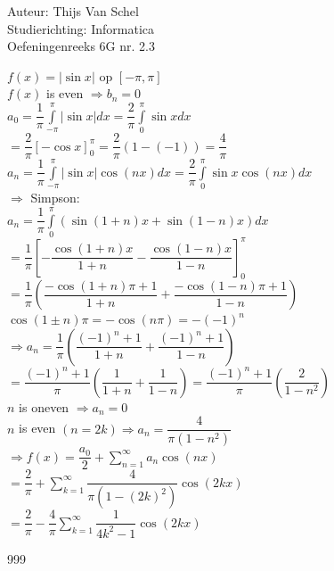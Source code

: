 \documentclass[a4paper]{article}
\newcommand{\dint}{\displaystyle\int}
\begin{document}
  
\noindent \large Auteur: Thijs Van Schel \\
\noindent \large Studierichting: Informatica\\
\noindent \large Oefeningenreeks 6G nr. 2.3\\

\medskip

\normalsize

$f(x) = |\sin x|$ op $[-\pi, \pi]$\\

$f(x)$ is even $ \Rightarrow b_n = 0$\\

$a_0 = \dfrac{1}{\pi} \dint\limits_{-\pi}^{\pi} |\sin x| dx = \dfrac{2}{\pi} \dint\limits_{0}^{\pi} \sin x dx$\\

$= \dfrac{2}{\pi} [-\cos x]_{0}^{\pi} = \dfrac{2}{\pi} (1 - (-1)) = \dfrac{4}{\pi}$ \\

$a_n = \dfrac{1}{\pi} \dint\limits_{-\pi}^{\pi} |\sin x| \cos(nx) dx = \dfrac{2}{\pi} \dint\limits_{0}^{\pi} \sin x \cos(nx)dx$\\

$\Rightarrow$ Simpson:\\

$a_n = \dfrac{1}{\pi} \dint\limits_{0}^{\pi} (\sin(1+n)x + \sin(1-n)x)dx$\\

$= \dfrac{1}{\pi} \left[ -\dfrac{\cos(1+n)x}{1+n} - \dfrac{\cos(1-n)x}{1-n} \right]_{0}^{\pi}$\\

$= \dfrac{1}{\pi}\left( \dfrac{- \cos(1+n)\pi + 1}{1+n} + \dfrac{- \cos(1-n)\pi + 1}{1-n}\right)$\\

$\cos(1 \pm n)\pi = -\cos(n\pi) = -(-1)^n$\\

$\Rightarrow a_n = \dfrac{1}{\pi} \left( \dfrac{(-1)^n + 1}{1+n} + \dfrac{(-1)^n + 1}{1-n} \right)$\\

$= \dfrac{(-1)^n + 1}{\pi} \left( \dfrac{1}{1+n} + \dfrac{1}{1-n} \right) = \dfrac{(-1)^n + 1}{\pi} \left( \dfrac{2}{1-n^2} \right)$\\

$n $ is oneven $ \Rightarrow a_n = 0$\\

$n $ is even $ (n=2k) \Rightarrow a_n = \dfrac{4}{\pi(1-n^2)}$\\

$\Rightarrow f(x) = \dfrac{a_0}{2} + \displaystyle\sum_{n=1}^{\infty} a_n \cos(nx)$\\

$= \dfrac{2}{\pi} + \displaystyle\sum_{k=1}^{\infty} \dfrac{4}{\pi(1-(2k)^2)} \cos(2kx)$\\

$= \dfrac{2}{\pi} - \dfrac{4}{\pi} \displaystyle\sum_{k=1}^{\infty} \dfrac{1}{4k^2-1} \cos(2kx)$

\begin{thebibliography}{999}
\end{thebibliography}
\end{document}
